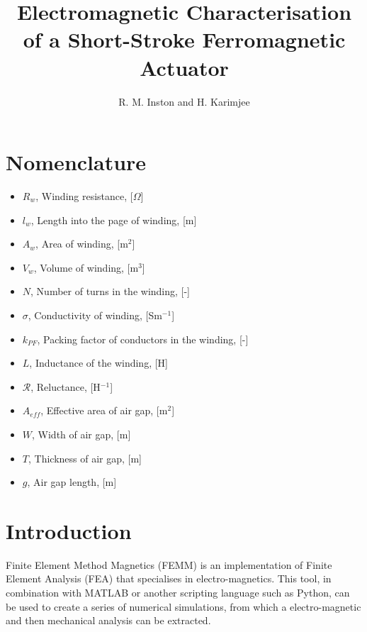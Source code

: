 \documentclass[a4paper]{IEEEtran}
\begin{document}
\title{Electromagnetic Characterisation of a Short-Stroke Ferromagnetic Actuator}
\author{R. M. Inston and H. Karimjee}

\maketitle

\section{Nomenclature}
    \begin{itemize}
    \item[]{$R_{w}$, Winding resistance, [$\Omega$]}
    \item[]{$l_{w}$, Length into the page of winding, [m]}
    \item[]{$A_{w}$, Area of winding, [m$^{2}$]}
    \item[]{$V_{w}$, Volume of winding, [m$^{3}$]}
    \item[]{$N$, Number of turns in the winding, [-]}
    \item[]{$\sigma$, Conductivity of winding, [Sm$^{-1}$]}
    \item[]{$k_{PF}$, Packing factor of conductors in the winding, [-]}
    \item[]{$L$, Inductance of the winding, [H]}
    \item[]{$\mathcal{R}$, Reluctance, [H$^{-1}$]}
    \item[]{$A_{eff}$, Effective area of air gap, [m$^{2}$]}
    \item[]{$W$, Width of air gap, [m]}
    \item[]{$T$, Thickness of air gap, [m]}
    \item[]{$g$, Air gap length, [m]}
    \end{itemize}

\section{Introduction}

    Finite Element Method Magnetics (FEMM) is an implementation of Finite Element Analysis (FEA) that specialises in electro-magnetics. This tool, in combination with MATLAB or another scripting language such as Python, can be used to create a series of numerical simulations, from which a electro-magnetic and then mechanical analysis can be extracted. 
    
\end{document}
